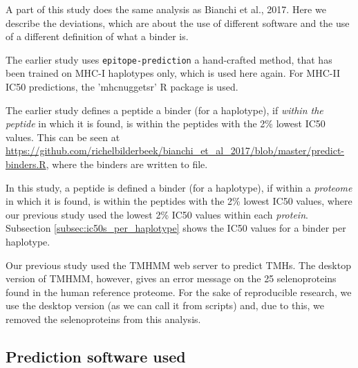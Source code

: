 A part of this study does the same analysis as Bianchi et al., 2017.
Here we describe the deviations, which are about the use of different
software and the use of a different definition of what a binder is.


The earlier study uses \verb;epitope-prediction; a hand-crafted method, 
that has been trained on MHC-I haplotypes only,
which is used here again. For MHC-II IC50 predictions, the
'mhcnuggetsr' R package is used.


The earlier study defines a peptide a binder (for a haplotype), 
if \emph{within the peptide} in which it is found, 
is within the peptides with the 2\% lowest IC50 values.
This can be seen at \url{https://github.com/richelbilderbeek/bianchi_et_al_2017/blob/master/predict-binders.R},
where the binders are written to file.

In this study, a peptide is defined a binder (for a haplotype), 
if within a \emph{proteome} in which it is found, 
is within the peptides with the 2\% lowest IC50 values,
where our previous study used the lowest 2\% IC50 values
within each \emph{protein}.
Subsection \ref{subsec:ic50s_per_haplotype} shows the IC50 values
for a binder per haplotype.


Our previous study used the TMHMM web server
to predict TMHs.
The desktop version of TMHMM, however, gives an
error message on the 25 selenoproteins found in the human
reference proteome.
For the sake of reproducible research, we use the desktop version (as
we can call it from scripts) and, due to this, we removed the
selenoproteins from this analysis.

\subsection{Prediction software used}
\label{subsec:prediction_software_used}

